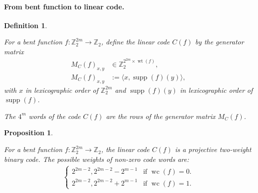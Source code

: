 \documentclass[12pt,a4paper]{article}
\newcommand{\mb}[1]{\mathbb{#1}}
\newcommand{\Z}{\mb{Z}}
\newcommand{\To}{\rightarrow}
\newcommand{\support}[1]{\operatorname{supp}\left(#1\right)}
\newcommand{\weight}[1]{\operatorname{wt}\left(#1\right)}
\newcommand{\weightclass}[1]{\operatorname{wc}\left(#1\right)}
\newtheorem{Proposition}{Proposition}
\newtheorem{Definition}{Definition}
\begin{document}
\paragraph*{From bent function to linear code.}
\begin{Definition}
\cite[Corollary 10]{DinD15class}

For a bent function $f : \Z_2^{2m} \To \Z_2$,
define the linear code $C(f)$ by the generator matrix
\begin{align*}
M_C(f)_{x,y} &\in \Z_2^{2^{2m} \times \weight{f}},
\\
M_C(f)_{x,y} &:= \langle x, \support{f}(y) \rangle,
\end{align*}
with $x$ in lexicographic order of $\Z_2^{2m}$
and $\support{f}(y)$ in lexicographic order of $\support{f}$.

The $4^m$ words of the code $C(f)$ are the rows of the generator matrix $M_C(f)$.
\end{Definition}

%
\begin{Proposition}
\cite[Corollary 10]{DinD15class}

For a bent function $f : \Z_2^{2m} \To \Z_2$, the linear code $C(f)$
is a projective two-weight binary code.
%
%
The possible weights of non-zero code words are:
\begin{align*}
\begin{cases}
2^{2m-2}, 2^{2m-2} - 2^{m-1} & \text{if~} \weightclass{f}=0.
\\
2^{2m-2}, 2^{2m-2} + 2^{m-1} & \text{if~} \weightclass{f}=1.
\end{cases}
\end{align*}
%
\end{Proposition}
%
%
\end{document}
